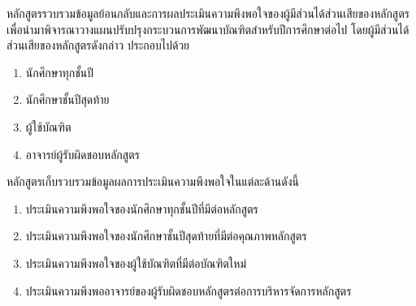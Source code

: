 \begin{doclist}
\end{doclist}













หลักสูตรรวบรวมข้อมูลย้อนกลับและการผลประเมินความพึงพอใจของผู้มีส่วนได้ส่วนเสียของหลักสูตร เพื่อนำมาพิจารณาวางแผนปรับปรุงกระบวนการพัฒนาบัณฑิตสำหรับปีการศึกษาต่อไป โดยผู้มีส่วนได้ส่วนเสียของหลักสูตรดังกล่าว ประกอบไปด้วย

\begin{enumerate}
	\item นักศึกษาทุกชั้นปี
	\item นักศึกษาชั้นปีสุดท้าย
	\item ผู้ใช้บัณฑิต
	\item อาจารย์ผู้รับผิดชอบหลักสูตร
\end{enumerate}
หลักสูตรเก็บรวบรวมข้อมูลผลการประเมินความพึงพอใจในแต่ละด้านดังนี้
\begin{enumerate}
	\item ประเมินความพึงพอใจของนักศึกษาทุกชั้นปีที่มีต่อหลักสูตร
	\item ประเมินความพึงพอใจของนักศึกษาชั้นปีสุดท้ายที่มีต่อคุณภาพหลักสูตร
	\item ประเมินความพึงพอใจของผู้ใช้บัณฑิตที่มีต่อบัณฑิตใหม่
	\item ประเมินความพึงพออาจารย์ของผู้รับผิดชอบหลักสูตรต่อการบริหารจัดการหลักสูตร
\end{enumerate}


